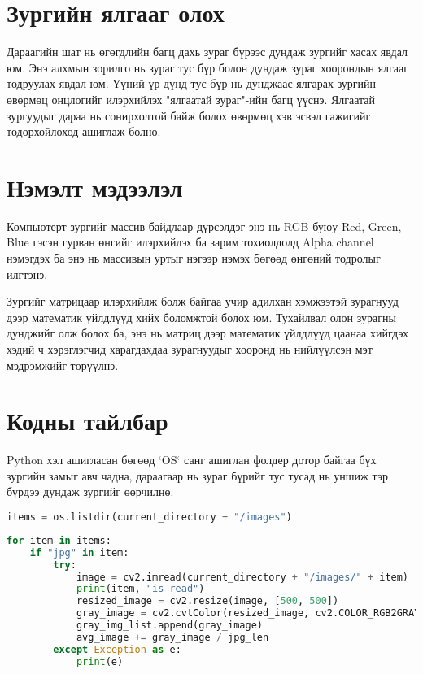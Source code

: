 \section{Зургийн ялгааг олох}
Дараагийн шат нь өгөгдлийн багц дахь зураг бүрээс дундаж зургийг хасах явдал юм. Энэ алхмын зорилго нь зураг тус бүр болон дундаж зураг хоорондын ялгааг тодруулах явдал юм. Үүний үр дүнд тус бүр нь дунджаас ялгарах зургийн өвөрмөц онцлогийг илэрхийлэх "ялгаатай зураг"-ийн багц үүснэ. Ялгаатай зургуудыг дараа нь сонирхолтой байж болох өвөрмөц хэв эсвэл гажигийг тодорхойлоход ашиглаж болно.

\section{Нэмэлт мэдээлэл}

Компьютерт зургийг массив байдлаар дүрсэлдэг энэ нь RGB буюу Red, Green, Blue гэсэн гурван өнгийг илэрхийлэх ба зарим тохиолдолд Alpha channel нэмэгдэх ба энэ нь массивын уртыг нэгээр нэмэх бөгөөд өнгөний тодролыг илгтэнэ.

Зургийг матрицаар илэрхийлж болж байгаа учир адилхан хэмжээтэй зурагнууд дээр математик үйлдлүүд хийх боломжтой болох юм. Тухайлвал олон зурагны дунджийг олж болох ба, энэ нь матриц дээр математик үйлдлүүд цаанаа хийгдэх хэдий ч хэрэглэгчид харагдахдаа зурагнуудыг хооронд нь нийлүүлсэн мэт мэдрэмжийг төрүүлнэ.

\section{Кодны тайлбар}
Python хэл ашигласан бөгөөд `OS` санг ашиглан фолдер дотор байгаа бүх зургийн замыг авч чадна, дараагаар нь зураг бүрийг тус тусад нь уншиж тэр бүрдээ дундаж зургийг өөрчилнө.



\begin{lstlisting}[language=Python, caption=Дундаж зураг тооцоолох код, frame=single]
items = os.listdir(current_directory + "/images")
\end{lstlisting}

\begin{lstlisting}[language=Python, caption=Дундаж зураг тооцоолох код, frame=single]
	for item in items:
    if "jpg" in item:
        try:
            image = cv2.imread(current_directory + "/images/" + item)
            print(item, "is read")
            resized_image = cv2.resize(image, [500, 500])
            gray_image = cv2.cvtColor(resized_image, cv2.COLOR_RGB2GRAY)
            gray_img_list.append(gray_image)
            avg_image += gray_image / jpg_len
        except Exception as e:
            print(e)
\end{lstlisting}

